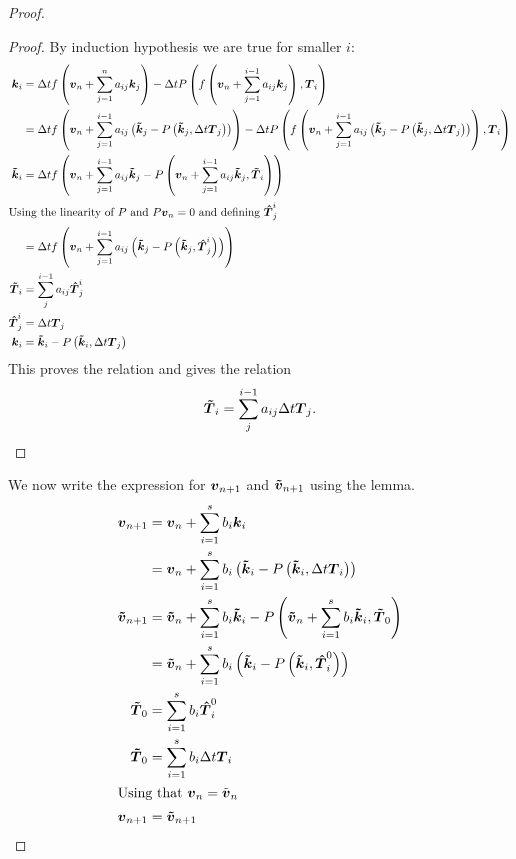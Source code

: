 \begin{proof}
\begin{proof}
By induction hypothesis we are true for smaller $i$:
\begin{align*}
  {\boldsymbol {k}}_{i}&=\Delta tf\left({\boldsymbol {v}}_n+\sum_{j=1}^{n}a_{ij}{\boldsymbol {k}}_{j}\right)-\Delta tP\left(f\left({\boldsymbol {v}}_n+\sum_{j=1}^{i-1}a_{ij}{\boldsymbol {k}}_{j}\right),{\boldsymbol {T}}_{i}\right)\\
  &=\Delta tf\left({\boldsymbol {v}}_n+\sum_{j=1}^{i-1}a_{ij}\left({\boldsymbol {\tilde{k}}}_{j}-P\left({\boldsymbol {\tilde{k}}}_{j},\Delta t {\boldsymbol {T}}_{j}\right)\right)\right)-\Delta tP\left(f\left({\boldsymbol {v}}_n+\sum_{j=1}^{i-1}a_{ij}\left({\boldsymbol {\tilde{k}}}_{j}-P\left({\boldsymbol {\tilde{k}}}_{j},\Delta t {\boldsymbol {T}}_{j}\right)\right)\right),{\boldsymbol {T}}_{i}\right)\\
  {\boldsymbol {\tilde{k}}}_{i}&=\Delta tf\left({\boldsymbol {v}}_n+\sum_{j=1}^{i-1}a_{ij}{\boldsymbol {\tilde{k}}}_{j}-P\left({\boldsymbol {v}}_n+\sum_{j=1}^{i-1}a_{ij}{\boldsymbol {\tilde{k}}}_{j},{\boldsymbol {{\boldsymbol {\tilde{T}}}}}_{i}\right)\right)\\
  \intertext{Using the linearity of $P$ and $P{\boldsymbol {v}}_n=0$ and defining ${\boldsymbol {\hat{T}}}_{j}^i$}
  &=\Delta tf\left({\boldsymbol {v}}_n+\sum_{j=1}^{i-1}a_{ij}\left({\boldsymbol {\tilde{k}}}_{j}-P\left({\boldsymbol {\tilde{k}}}_{j},{\boldsymbol {\hat{T}}}_{j}^{i}\right)\right)\right)\\
  {\boldsymbol {\tilde{T}}}_i&=\sum_{j}^{i-1}a_{ij}{\boldsymbol {\hat{T}}}_{j}^{i}\\
  {\boldsymbol {\hat{T}}}^{i}_{j}&=\Delta t {\boldsymbol {T}}_{j}\\
  {\boldsymbol {k}}_{i}&={\boldsymbol {\tilde{k}}}_{i}-P\left({\boldsymbol {\tilde{k}}}_{i},\Delta t{\boldsymbol {T}}_j\right)
\end{align*}
This proves the relation and gives the relation
\begin{equation}
  {\boldsymbol {\tilde{T}}}_i=\sum_{j}^{i-1}a_{ij}\Delta t {\boldsymbol {T}}_{j}.
\end{equation}
\end{proof}

We now write the expression for ${\boldsymbol {v}}_{n+1}$ and ${\boldsymbol {\tilde{v}}}_{n+1}$ using the lemma.
\begin{align*}
{\boldsymbol {v}}_{n+1}&={\boldsymbol {v}}_{n}+\sum_{i=1}^{s}b_{i}{\boldsymbol {k}}_{i}\\
&={\boldsymbol {v}}_{n}+\sum_{i=1}^{s}b_{i}\left({\boldsymbol {\tilde{k}}}_{i}-P\left({\boldsymbol {\tilde{k}}}_{i},\Delta t{\boldsymbol {T}}_{i}\right)\right)\\
{\boldsymbol {\tilde{v}}}_{n+1}&={\boldsymbol {\tilde{v}}}_{n}+\sum_{i=1}^{s}b_{i}{\boldsymbol {\tilde{k}}}_{i}-P\left({\boldsymbol {\tilde{v}}}_{n}+\sum_{i=1}^{s}b_{i}{\boldsymbol {\tilde{k}}}_{i},{\boldsymbol {\tilde{T}}}_{0}\right)\\
&={\boldsymbol {\tilde{v}}}_{n}+\sum_{i=1}^{s}b_{i}\left({\boldsymbol {\tilde{k}}}_{i}-P\left({\boldsymbol {\tilde{k}}}_{i},{\boldsymbol {\hat{T}}}_{i}^{0}\right)\right)\\
{\boldsymbol {\tilde{T}}}_{0}&=\sum_{i=1}^{s}b_{i}{\boldsymbol {\hat{T}}}_{i}^{0}\\
{\boldsymbol {\tilde{T}}}_{0}&=\sum_{i=1}^{s}b_{i}\Delta t {\boldsymbol {T}}_{i}\\
\intertext{Using that ${\boldsymbol {v}}_{n}=\tilde{{\boldsymbol {v}}}_{n}$}
{\boldsymbol {v}}_{n+1}&={\boldsymbol {\tilde{v}}}_{n+1}
\end{align*}

\end{proof}

